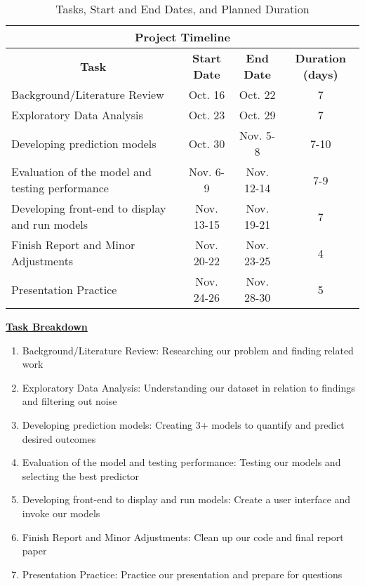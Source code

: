 \documentclass[11pt, letterpaper]{article}
\begin{document}
    \begin{table}[htbp]
        \centering
        \begin{tabular}{l|c|c|c}
            \hline \hline
            \multicolumn{4}{c}{\textbf{Project Timeline}} \\ %
            \hline \hline
            \multicolumn{1}{c|}{\textbf{Task}} & \textbf{Start Date} & \textbf{End Date} & \textbf{Duration (days)} \\
            \hline
            Background/Literature Review & Oct. 16 & Oct. 22 & 7 \\
            \hline
            Exploratory Data Analysis & Oct. 23 & Oct. 29 & 7 \\
            \hline
            Developing prediction models & Oct. 30 & Nov. 5-8 & 7-10 \\
            \hline
            Evaluation of the model and testing performance & Nov. 6-9 & Nov. 12-14 & 7-9 \\
            \hline
            Developing front-end to display and run models & Nov. 13-15 & Nov. 19-21 & 7 \\
            \hline
            Finish Report and Minor Adjustments & Nov. 20-22 & Nov. 23-25 & 4 \\
            \hline
            Presentation Practice & Nov. 24-26 & Nov. 28-30 & 5 \\
            \hline \hline
        \end{tabular}
        \caption{Tasks, Start and End Dates, and Planned Duration}
        \label{tab:timeline}
    \end{table}

    \textbf{\underline{Task Breakdown}}
    \begin{enumerate}
        \item Background/Literature Review: Researching our problem and finding related work
        \item Exploratory Data Analysis: Understanding our dataset in relation to findings and filtering out noise
        \item Developing prediction models: Creating 3+ models to quantify and predict desired outcomes
        \item Evaluation of the model and testing performance: Testing our models and selecting the best predictor
        \item Developing front-end to display and run models: Create a user interface and invoke our models
        \item Finish Report and Minor Adjustments: Clean up our code and final report paper
        \item Presentation Practice: Practice our presentation and prepare for questions
    \end{enumerate}
\end{document}

